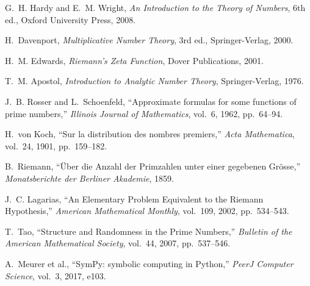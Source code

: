 \documentclass[11pt]{article}
\begin{document}
	
	\begin{thebibliography}{99}
		
		G.~H. Hardy and E.~M. Wright, \textit{An Introduction to the Theory of Numbers}, 6th ed., Oxford University Press, 2008.
		
		H.~Davenport, \textit{Multiplicative Number Theory}, 3rd ed., Springer-Verlag, 2000.
		
		H.~M. Edwards, \textit{Riemann's Zeta Function}, Dover Publications, 2001.
		
		T.~M. Apostol, \textit{Introduction to Analytic Number Theory}, Springer-Verlag, 1976.
		
		J.~B. Rosser and L.~Schoenfeld, ``Approximate formulas for some functions of prime numbers,'' \textit{Illinois Journal of Mathematics}, vol.~6, 1962, pp.~64--94.
		
		H.~von Koch, ``Sur la distribution des nombres premiers,'' \textit{Acta Mathematica}, vol.~24, 1901, pp.~159--182.
		
		B.~Riemann, ``Über die Anzahl der Primzahlen unter einer gegebenen Grösse,'' \textit{Monatsberichte der Berliner Akademie}, 1859.
		
		J.~C. Lagarias, ``An Elementary Problem Equivalent to the Riemann Hypothesis,'' \textit{American Mathematical Monthly}, vol.~109, 2002, pp.~534--543.
		
		T.~Tao, ``Structure and Randomness in the Prime Numbers,'' \textit{Bulletin of the American Mathematical Society}, vol.~44, 2007, pp.~537--546.
		
		A.~Meurer et al., ``SymPy: symbolic computing in Python,'' \textit{PeerJ Computer Science}, vol.~3, 2017, e103.
		
	\end{thebibliography}
\end{document}
